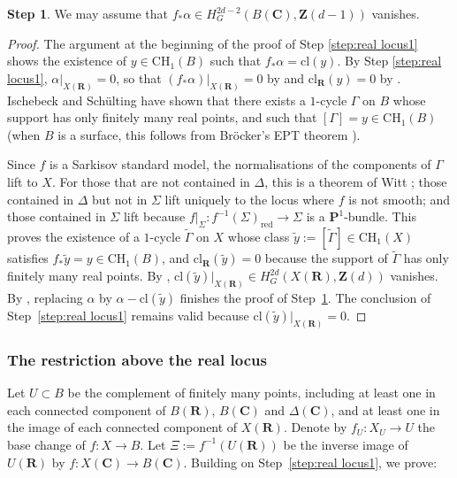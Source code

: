 \documentclass[JEP,XML,SOM,Unicode]{cedram}
\theoremstyle{plain}
\theoremstyle{definition}
\newtheorem{Step}{Step}
\numberwithin{equation}{section}
\newcommand{\cl}{{\mathrm{cl}}}
\renewcommand{\C}{{\mathbf C}}
\renewcommand{\P}{{\mathbf P}}
\newcommand{\R}{{\mathbf R}}
\newcommand{\Z}{{\mathbf Z}}
\newcommand{\CH}{\mathrm{CH}}
\newcommand{\red}{{\mathrm{red}}}
\begin{document}
\begin{Step}
\label{step:pushforward}
We may assume that $f_*\alpha\in H^{2d-2}_G(B(\C),\Z(d-1))$ vanishes.
\end{Step}

\begin{proof}
The argument at the beginning of the proof of Step \ref{step:real locus1}
shows the existence of $y\in \CH_1(B)$ such that $f_*\alpha=\cl(y)$. By Step \ref{step:real locus1}, $\alpha|_{X(\R)}=0$, so that $(f_*\alpha)|_{X(\R)}=0$ by \cite[Th.\,\ref*{BW1-th:stability of topological constraints}]{BW1}
and $\cl_{\R}(y)=0$ by \cite[Th.\,\ref*{BW1-th:conditions de krasnov}]{BW1}. Ischebeck and Schülting have shown \cite[Main Th.\,(4.3)]{IS} that there exists a $1$-cycle $\Gamma$ on $B$ whose support has only finitely many real points, and such that $[\Gamma]=y\in\CH_1(B)$ (when $B$ is a surface, this follows from Bröcker's EPT
theorem \cite{brocker}).

Since $f$ is a Sarkisov standard model, the normalisations of the components of $\Gamma$ lift to $X$. For those that are not contained in $\Delta$, this is a theorem of Witt \cite[Satz\,22]{WittHasse}; those contained in $\Delta$ but not in $\Sigma$ lift uniquely to the locus where $f$ is not smooth; and those contained in $\Sigma$ lift because $f|_{\Sigma}:f^{-1}(\Sigma)_{\red}\to\Sigma$ is a $\P^1$\nobreakdash-bundle.
This proves the existence of a $1$-cycle $\tilde{\Gamma}$ on $X$ whose class $\tilde y:=[\tilde{\Gamma}]\in \CH_1(X)$ satisfies $f_*\tilde y=y\in \CH_1(B)$, and $\cl_{\R}(\tilde y)=0$ because the support of $\tilde{\Gamma}$ has only finitely many real points. By \cite[Th.\,\ref*{BW1-th:conditions de krasnov}]{BW1}, $\cl(\tilde y)|_{X(\R)}\in H^{2d}_G(X(\R),\Z(d))$ vanishes.
By \cite[Th.\,\ref*{BW1-th:stability of topological constraints}]{BW1},
replacing $\alpha$ by $\alpha-\cl(\tilde y)$ finishes the proof of Step~\ref{step:pushforward}. The conclusion of Step~\ref{step:real locus1} remains valid because $\cl(\tilde y)|_{X(\R)}=0$.
\end{proof}

\subsubsection{The restriction above the real locus}

Let $U\subset B$ be the complement of finitely many points, including at least one in each connected component of $B(\R)$, $B(\C)$ and $\Delta(\C)$, and at least one in the image of each connected component of $X(\R)$.
Denote by $f_U:X_U\to U$
the base change of $f:X\to B$.
Let $\Xi:=f^{-1}(U(\R))$ be the inverse image of $U(\R)$ by $f:X(\C)\to B(\C)$.
Building on Step~\ref{step:real locus1}, we prove:
\end{document}

